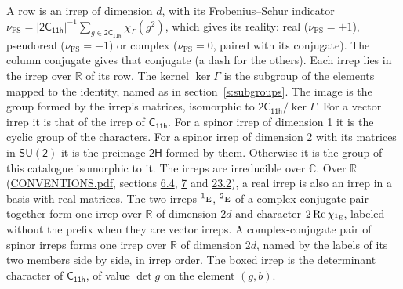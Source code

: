 \documentclass[10pt,a4paper]{article}
\numberwithin{equation}{section}
\newcommand{\grp}[1]{\mathsf{#1}}
\newcommand{\irr}[1]{\text{\normalfont\scshape #1}}
\newcommand{\conjpair}[1]{{}^{#1}}
\newcommand{\irchar}[1]{\chi_{#1}}
\newcommand{\fsind}{\nu_{\mathrm{FS}}}
\begin{document}
\leavevmode\label{n:index.frobenius}\label{n:head.irrep}\label{n:head.reality}A row is an irrep of dimension $d$, with its Frobenius--Schur indicator $\fsind = |\grp{2C_{11h}}|^{-1}\allowbreak\sum_{g\in\grp{2C_{11h}}}\irchar{\Gamma}(g^2)$, which gives its reality: real ($\fsind = +1$), pseudoreal ($\fsind = -1$) or complex ($\fsind = 0$, paired with its conjugate). \label{n:head.conjugate}The column conjugate gives that conjugate (a dash for the others). \label{n:head.over.real}Each irrep lies in the irrep over $\mathbb{R}$ of its row. \label{n:head.kernel}The kernel $\ker\Gamma$ is the subgroup of the elements mapped to the identity, named as in section~\ref{s:subgroups}. \label{n:head.image}The image is the group formed by the irrep's matrices, isomorphic to $\grp{2C_{11h}}/\ker\Gamma$. For a vector irrep it is that of the irrep of \href{../../../rotation/data/pdf/C11h.pdf}{$\grp{C_{11h}}$}. For a spinor irrep of dimension 1 it is the cyclic group of the characters. For a spinor irrep of dimension 2 with its matrices in $\grp{SU(2)}$ it is the preimage $\grp{2H}$ formed by them. Otherwise it is the group of this catalogue isomorphic to it. The irreps are irreducible over $\mathbb{C}$. Over $\mathbb{R}$ (\href{../../CONVENTIONS.pdf}{CONVENTIONS.pdf}, sections \href{../../../rotation/CONVENTIONS.pdf\#conv.6.4}{6.4}, \href{../../../rotation/CONVENTIONS.pdf\#conv.7}{7} and \href{../../CONVENTIONS.pdf\#conv.23.2}{23.2}), a real irrep is also an irrep in a basis with real matrices. The two irreps $\conjpair{1}\irr{e}$, $\conjpair{2}\irr{e}$ of a complex-conjugate pair together form one irrep over $\mathbb{R}$ of dimension $2d$ and character $2\operatorname{Re}\irchar{\conjpair{1}\irr{e}}$, labeled without the prefix when they are vector irreps. A complex-conjugate pair of spinor irreps forms one irrep over $\mathbb{R}$ of dimension $2d$, named by the labels of its two members side by side, in irrep order. \label{n:mark.determinant}The boxed irrep is the determinant character of \href{../../../rotation/data/pdf/C11h.pdf}{$\grp{C_{11h}}$}, of value $\det g$ on the element $(g, b)$.
\setlength{\emergencystretch}{2em}\par\setlength{\emergencystretch}{0pt}
\end{document}
